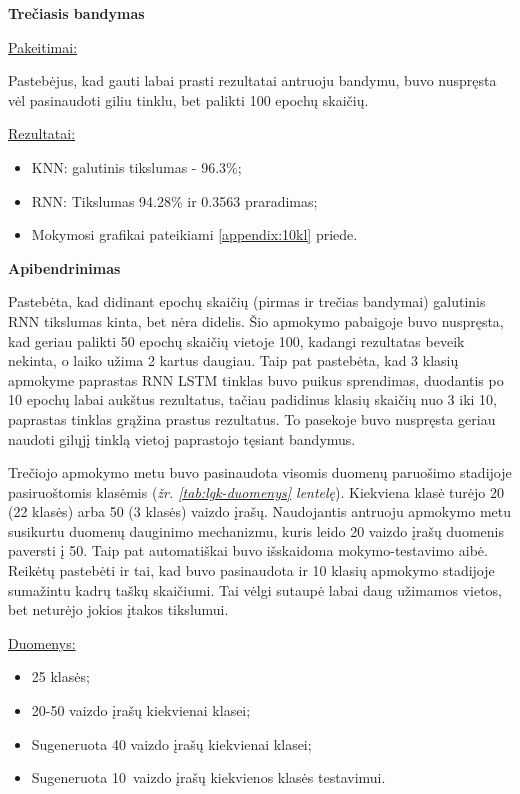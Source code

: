 \documentclass{VUMIFPSbakalaurinis}
\begin{document}
\bigbreak
\textbf{Trečiasis bandymas}

\underline{Pakeitimai:}

Pastebėjus, kad gauti labai prasti rezultatai antruoju bandymu, buvo nuspręsta vėl pasinaudoti giliu tinklu, bet palikti 100 epochų skaičių.

\underline{Rezultatai:}
\begin{itemize}
	\item KNN: galutinis tikslumas - 96.3\%;
	\item RNN: Tikslumas 94.28\% ir 0.3563 praradimas;
	\item Mokymosi grafikai pateikiami \ref{appendix:10kl} priede.
\end{itemize}

\bigbreak
\textbf{Apibendrinimas}

Pastebėta, kad didinant epochų skaičių (pirmas ir trečias bandymai) galutinis RNN tikslumas kinta, bet nėra didelis. Šio apmokymo pabaigoje buvo nuspręsta, kad geriau palikti 50 epochų skaičių vietoje 100, kadangi rezultatas beveik nekinta, o laiko užima 2 kartus daugiau. Taip pat pastebėta, kad 3 klasių apmokyme paprastas RNN LSTM tinklas buvo puikus sprendimas, duodantis po 10 epochų labai aukštus rezultatus, tačiau padidinus klasių skaičių nuo 3 iki 10, paprastas tinklas grąžina prastus rezultatus. To pasekoje buvo nuspręsta geriau naudoti gilųjį tinklą vietoj paprastojo tęsiant bandymus.


Trečiojo apmokymo metu buvo pasinaudota visomis duomenų paruošimo stadijoje pasiruoštomis klasėmis (\textit{žr. \ref{tab:lgk-duomenys} lentelę}).  Kiekviena klasė turėjo 20 (22 klasės) arba 50 (3 klasės) vaizdo įrašų. Naudojantis antruoju apmokymo metu susikurtu duomenų dauginimo mechanizmu, kuris leido 20 vaizdo įrašų duomenis paversti į 50. Taip pat automatiškai buvo išskaidoma mokymo-testavimo aibė. Reikėtų pastebėti ir tai, kad buvo pasinaudota ir 10 klasių apmokymo stadijoje sumažintu kadrų taškų skaičiumi. Tai vėlgi sutaupė labai daug užimamos vietos, bet neturėjo jokios įtakos tikslumui.

\underline{Duomenys:}

\begin{itemize}
	\item 25 klasės;
	\item 20-50 vaizdo įrašų kiekvienai klasei;
	\item Sugeneruota 40 vaizdo įrašų kiekvienai klasei;
	\item Sugeneruota 10 vaizdo įrašų kiekvienos klasės testavimui.
\end{itemize}
\end{document}
